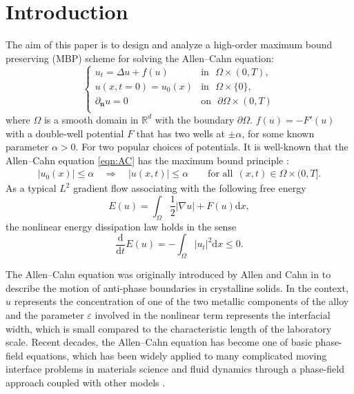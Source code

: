 \documentclass[10pt,final,leqno,onefignum,onetabnum]{siamltex}%
\def\d{\textrm{d}}
\def\d{\mathrm{d}}
\def\epsilon{\varepsilon}
\begin{document}
\section{Introduction}\label{Se:intro}
The aim of this paper is to design and analyze a high-order maximum bound preserving (MBP) scheme for solving the Allen--Cahn equation:
\begin{equation}\label{eqn:AC}
    \begin{cases}
    u_t = \Delta u + f(u) &
        \mbox{in~~} \Omega\times(0,T),\\
    u(x,t=0) = u_0(x)   &
        \mbox{in~~} \Omega\times\{0\},\\
    \partial_{\mathbf{n}}u = 0  &
        \mbox{on~~} \partial\Omega\times(0,T)\\
  \end{cases}
\end{equation}
where $\Omega$ is a smooth domain in $\mathbb{R}^d$ with the boundary $\partial\Omega$.
$f(u)=-F'(u)$ with a double-well potential $F$ that has two wells at $\pm\alpha$, for {some known parameter $\alpha>0$}. %
For two popular choices of potentials. It is well-known that the Allen--Cahn equation \eqref{eqn:AC} has the maximum bound principle \cite{DuJuLiQiao:2020}:
\begin{align}\label{eqn:max-AC}
|u_0(x)|\le \alpha\quad \Longrightarrow\quad |u(x,t)| \le \alpha\qquad \text{for all} ~~(x,t)\in \Omega\times(0,T].
\end{align}
As a typical $L^2$ gradient flow associating with the following free energy
$$E(u)=\int_\Omega\frac{1}{2}|\nabla u|+F(u)\d x,$$
 the nonlinear energy dissipation law holds in the sense
\begin{equation}\label{enlaw}\frac{\d}{\d t}E(u)=-\int_\Omega|u_t|^2\d x\le 0.\end{equation}

The Allen--Cahn equation was originally introduced by Allen and Cahn in \cite{AC} to describe the motion of anti-phase boundaries in crystalline solids. In the context, $u$ represents the concentration of one of the two metallic components of the alloy and
the parameter $\epsilon$ involved in the nonlinear term  represents the interfacial width, which is small compared to the
characteristic length of the laboratory scale. Recent decades, the Allen--Cahn equation has become one of basic phase-field equations, which has been widely applied to many complicated moving interface problems in materials science and fluid dynamics through a phase-field approach coupled with other models \cite{anderson1998diffuse,chen2002phase,yue2004diffuse}.
\end{document}

